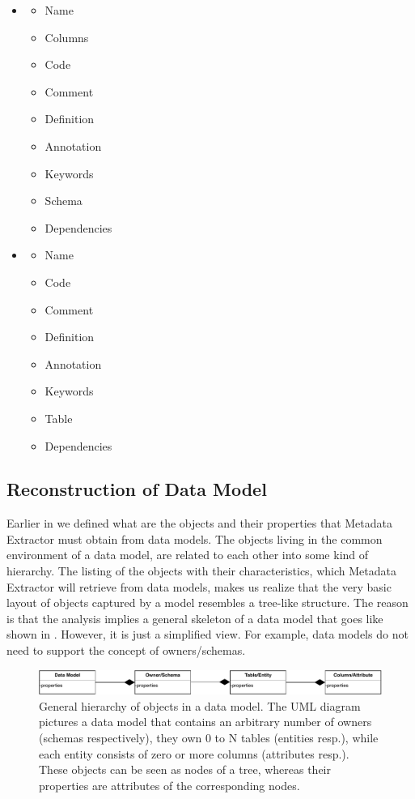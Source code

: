 \begin{itemize}
	\item {}
	\begin{itemize}
		\item Name 
		\item Columns
		\item Code 
		\item Comment
		\item Definition
		\item Annotation
		\item Keywords
		\item Schema
		\item Dependencies
	\end{itemize}
	\item {}
	\begin{itemize}
		\item Name 
		\item Code 
		\item Comment
		\item Definition
		\item Annotation
		\item Keywords
		\item Table
		\item Dependencies
	\end{itemize}
\end{itemize}

\subsection{Reconstruction of Data Model}

Earlier in  we defined what are the objects and their properties that Metadata Extractor must obtain from data models.
The objects living in the common environment of a data model, are related to each other into some kind of hierarchy.
The listing of the objects with their characteristics, which Metadata Extractor will retrieve from data models, makes us realize that the very basic layout of objects captured by a model resembles a tree-like structure.
The reason is that the analysis implies a general skeleton of a data model that goes like shown in . However, it is just a simplified view. For example, data models do not need to support the concept of owners/schemas.

\begin{figure}[H]
	\centering
	\includegraphics[width=14cm]{../img/DataModelHierarchy}
	\caption[Hierarchy of Objects in a Data Model]{General hierarchy of objects in a data model. The UML diagram pictures a data model that contains an arbitrary number of owners (schemas respectively), they own 0 to N tables (entities resp.), while each entity consists of zero or more columns (attributes resp.). These objects can be seen as nodes of a tree, whereas their properties are attributes of the corresponding nodes.}
	\label{DataModelHierarchy}
\end{figure} 

